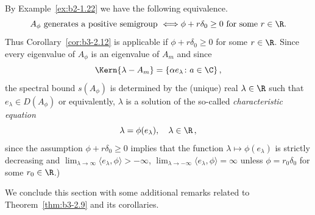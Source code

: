 \begin{example}
\begin{enumerate}[\upshape (i), wide, labelindent=.25em]
By Example~\ref{ex:b2-1.22} we have the following equivalence.
\begin{equation}\label{eq:b3-2.29}
	A_{\phi} \text{ generates a positive semigroup } \Longleftrightarrow \phi + r\delta_{0} \geq 0 \text{ for some } r \in \R.
\end{equation}
Thus Corollary~\ref{cor:b3-2.12} is applicable if\/ $\phi + r\delta_{0} \geq 0$ for some $r \in \R$.
Since every eigenvalue of\/ $A_{\phi}$ is an eigenvalue of\/ $A_{m}$ and since 
\[
\Kern{\lambda-A_{m}} = \{\alpha e_{\lambda} \colon a \in \C\}\,,
\]
the spectral bound $s(A_{\phi})$ is determined by the (unique) real $\lambda \in \R$ such that $e_{\lambda} \in D(A_{\phi})$ or equivalently, $\lambda$ is a solution of the so-called \emph{characteristic equation}
\begin{equation}\label{eq:b3-2.30}
	\lambda = \phi(e_{\lambda}), \quad \lambda \in \R\,,
\end{equation}
since the assumption $\phi + r\delta_{0} \geq 0$ implies that the function $\lambda \mapsto \phi(e_{\lambda})$ is strictly decreasing and $\lim_{\lambda \to \infty}\langle e_{\lambda},\phi \rangle > -\infty$, $\lim_{\lambda \to -\infty}\langle e_{\lambda},\phi \rangle = \infty$ unless $\phi = r_{0}\delta_{0}$ for some $r_{0} \in \R$.)
\end{enumerate}
\end{example}
We conclude this section with some additional remarks related to Theorem~\ref{thm:b3-2.9} and its corollaries.
